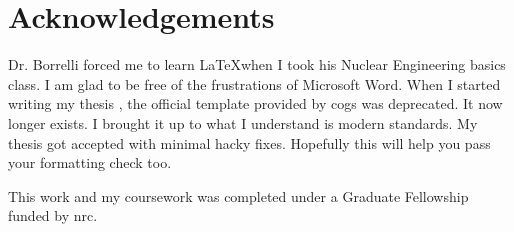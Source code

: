    \chapter{Acknowledgements}
   Dr. Borrelli forced me to learn \LaTeX when I took his Nuclear Engineering basics class. I am glad to be free of the frustrations of Microsoft Word. When I started writing my thesis \cite{RootMS}, the official template provided by \acs{cogs} was deprecated. It now longer exists. I brought it up to what I understand is modern standards. My thesis got accepted with minimal hacky fixes. Hopefully this will help you pass your formatting check too.

     This work and my coursework was completed under a Graduate Fellowship funded by \acf{nrc}.
